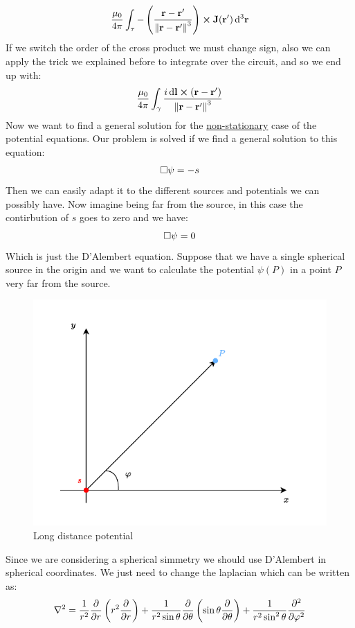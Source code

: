 \begin{equation}
  \dfrac{\mu_0}{4 \pi }\int_{\tau}-\left(\dfrac{\vb{r}-\vb{r}'}{\norm{\vb{r}-\vb{r}'}^3}\right) \cross \vb{J}(\vb{r}')\dd{^3 \vb{r}}
\end{equation}
If we switch the order of the cross product we must change sign, also we can apply the trick we explained before to integrate over the circuit, and so we end up with:
\begin{equation}
  \dfrac{\mu_0}{4 \pi }\int_{\gamma}\dfrac{i \dd{\vb{l}} \cross \left(\vb{r}-\vb{r}'\right)}{\norm{\vb{r}-\vb{r}'}^3}
\end{equation}
Now we want to find a general solution for the \underline{non-stationary} case of the potential equations. Our problem is solved if we find a general solution to this equation:
\begin{equation}
  \square \psi = -s
\end{equation}
Then we can easily adapt it to the different sources and potentials we can possibly have. Now imagine being far from the source, in this case the contirbution of $s$ goes to zero and we have:
\begin{equation}
  \square \psi = 0
\end{equation}
Which is just the D'Alembert equation. Suppose that we have a single spherical source in the origin and we want to calculate the potential $\psi (P)$ in a point $P$ very far from the source.
\begin{figure}[H]
  \centering
  \includegraphics[width=0.7\linewidth]{res/svg/long_distance_potential.drawio}
  \caption{Long distance potential}
\end{figure}
Since we are considering a spherical simmetry we should use D'Alembert in spherical coordinates. We just need to change the laplacian which can be written as:
\begin{equation}
  \lap = \dfrac{1}{r^2} \pdv{}{r}\left(r^2 \pdv{}{r}\right) + \dfrac{1}{r^2 \sin{\theta}} \pdv{}{\theta}\left(\sin{\theta} \pdv{}{\theta}\right) + \dfrac{1}{r^2 \sin^2{\theta}} \pdv[2]{}{\varphi}
\end{equation}
